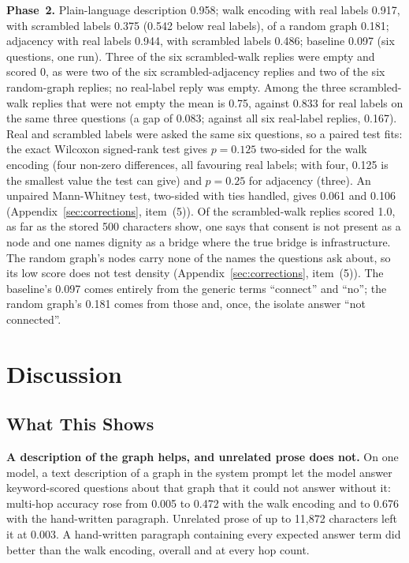 \documentclass[11pt,a4paper]{article}
\begin{document}
\textbf{Phase~2.} Plain-language description 0.958; walk encoding with real labels 0.917, with scrambled labels 0.375 (0.542 below real labels), of a random graph 0.181; adjacency with real labels 0.944, with scrambled labels 0.486; baseline 0.097 (six questions, one run). Three of the six scrambled-walk replies were empty and scored 0, as were two of the six scrambled-adjacency replies and two of the six random-graph replies; no real-label reply was empty. Among the three scrambled-walk replies that were not empty the mean is 0.75, against 0.833 for real labels on the same three questions (a gap of 0.083; against all six real-label replies, 0.167). Real and scrambled labels were asked the same six questions, so a paired test fits: the exact Wilcoxon signed-rank test gives $p = 0.125$ two-sided for the walk encoding (four non-zero differences, all favouring real labels; with four, 0.125 is the smallest value the test can give) and $p = 0.25$ for adjacency (three). An unpaired Mann-Whitney test, two-sided with ties handled, gives 0.061 and 0.106 (Appendix~\ref{sec:corrections}, item~(5)). Of the scrambled-walk replies scored 1.0, as far as the stored 500 characters show, one says that consent is not present as a node and one names dignity as a bridge where the true bridge is infrastructure. The random graph's nodes carry none of the names the questions ask about, so its low score does not test density (Appendix~\ref{sec:corrections}, item~(5)). The baseline's 0.097 comes entirely from the generic terms ``connect'' and ``no''; the random graph's 0.181 comes from those and, once, the isolate answer ``not connected''.

\section{Discussion}

\subsection{What This Shows}

\textbf{A description of the graph helps, and unrelated prose does not.} On one model, a text description of a graph in the system prompt let the model answer keyword-scored questions about that graph that it could not answer without it: multi-hop accuracy rose from 0.005 to 0.472 with the walk encoding and to 0.676 with the hand-written paragraph. Unrelated prose of up to 11,872 characters left it at 0.003. A hand-written paragraph containing every expected answer term did better than the walk encoding, overall and at every hop count.
\end{document}
